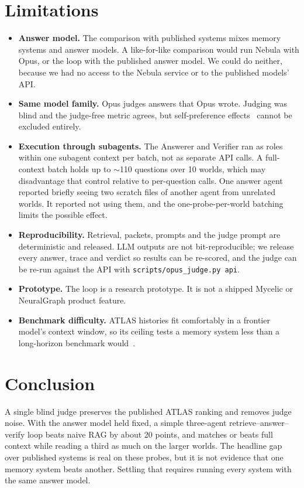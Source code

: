 \documentclass[11pt]{article}
\begin{document}
\section{Limitations}\label{sec:limits}
\begin{itemize}
\item \textbf{Answer model.} The comparison with published systems mixes memory systems and answer models. A like-for-like comparison would run Nebula with Opus, or the loop with the published answer model. We could do neither, because we had no access to the Nebula service or to the published models' API.
\item \textbf{Same model family.} Opus judges answers that Opus wrote. Judging was blind and the judge-free metric agrees, but self-preference effects~\citep{zheng2023judge} cannot be excluded entirely.
\item \textbf{Execution through subagents.} The Answerer and Verifier ran as roles within one subagent context per batch, not as separate API calls. A full-context batch holds up to ${\sim}$110 questions over 10 worlds, which may disadvantage that control relative to per-question calls. One answer agent reported briefly seeing two scratch files of another agent from unrelated worlds. It reported not using them, and the one-probe-per-world batching limits the possible effect.
\item \textbf{Reproducibility.} Retrieval, packets, prompts and the judge prompt are deterministic and released. LLM outputs are not bit-reproducible; we release every answer, trace and verdict so results can be re-scored, and the judge can be re-run against the API with \texttt{scripts/opus\_judge.py api}.
\item \textbf{Prototype.} The loop is a research prototype. It is not a shipped Mycelic or NeuralGraph product feature.
\item \textbf{Benchmark difficulty.} ATLAS histories fit comfortably in a frontier model's context window, so its ceiling tests a memory system less than a long-horizon benchmark would~\citep{maharana2024locomo,wu2024longmemeval}.
\end{itemize}

\section{Conclusion}
A single blind judge preserves the published ATLAS ranking and removes judge noise. With the answer model held fixed, a simple three-agent retrieve--answer--verify loop beats naive RAG by about 20 points, and matches or beats full context while reading a third as much on the larger worlds. The headline gap over published systems is real on these probes, but it is not evidence that one memory system beats another. Settling that requires running every system with the same answer model.
\end{document}
